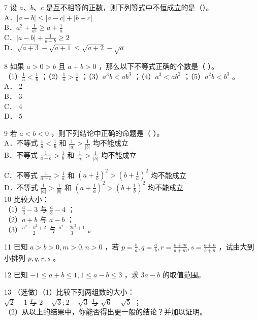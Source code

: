 \documentclass[10pt]{article}
\begin{document}
7 设 \(a 、 b 、 c\) 是互不相等的正数，则下列等式中不恒成立的是（）。\\
A．\(|a-b| \leqslant|a-c|+|b-c|\)\\
B．\(a^{2}+\frac{1}{a^{2}} \geqslant a+\frac{1}{a}\)\\
C．\(|a-b|+\frac{1}{a-b} \geqslant 2\)\\
D．\(\sqrt{a+3}-\sqrt{a+1} \leqslant \sqrt{a+2}-\sqrt{a}\)

8 如果 \(a>0>b\) 且 \(a+b>0\) ，那么以下不等式正确的个数是（ ）。\\
（1）\(\frac{1}{a}<\frac{1}{b}\) ；（2）\(\frac{1}{a}>\frac{1}{b}\) ；（3）\(a^{3} b<a b^{3}\) ；（4）\(a^{3}<a b^{2}\) ；（5）\(a^{2} b<b^{3}\) 。\\
A． 2\\
B． 3\\
C． 4\\
D． 5

9 若 \(a<b<0\) ，则下列结论中正确的命题是（ ）。\\
A．不等式 \(\frac{1}{a}<\frac{1}{b}\) 和 \(\frac{1}{|a|}>\frac{1}{|b|}\) 均不能成立\\
B．不等式 \(\frac{1}{a-b}>\frac{1}{b}\) 和 \(\frac{1}{|a|}>\frac{1}{|b|}\) 均不能成立

C．不等式 \(\frac{1}{a-b}>\frac{1}{a}\) 和 \(\left(a+\frac{1}{b}\right)^{2}>\left(b+\frac{1}{a}\right)^{2}\) 均不能成立\\
D．不等式 \(\frac{1}{|a|}>\frac{1}{|b|}\) 和 \(\left(a+\frac{1}{a}\right)^{2}>\left(b+\frac{1}{b}\right)^{2}\) 均不能成立\\
10 比较大小：\\
（1）\(\frac{a}{3}-3\) 与 \(\frac{a}{3}-4\) ；\\
（2）\(a+b\) 与 \(a-b\) ；\\
（3）\(\frac{a^{2}-b^{2}+2}{2}\) 与 \(\frac{a^{2}-2 b^{2}+1}{3}\) 。

11 已知 \(a>b>0, m>0, n>0\) ，若 \(p=\frac{b}{a}, q=\frac{a}{b}, r=\frac{b+m}{a+m}, s=\frac{a+n}{b+n}\) ，试由大到小排列 \(p, q, r, s\) 。

12 已知 \(-1 \leqslant a+b \leqslant 1,1 \leqslant a-b \leqslant 3\) ，求 \(3 a-b\) 的取值范围。

13 （选做）（1）比较下列两组数的大小：\\
\(\sqrt{2}-1\) 与 \(2-\sqrt{3} ; 2-\sqrt{3}\) 与 \(\sqrt{6}-\sqrt{5}\) ；\\
（2）从以上的结果中，你能否得出更一般的结论？并加以证明。
\end{document}
